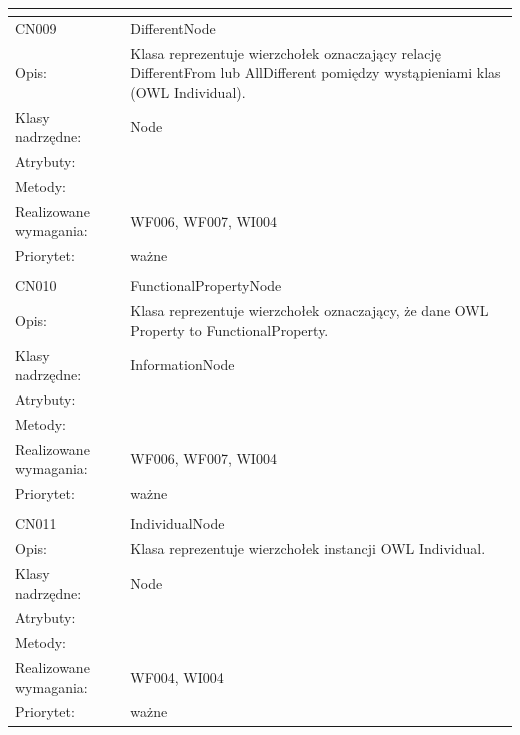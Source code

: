\documentclass[a4paper,10pt]{article}
\begin{document}
\begin{center}
\begin{longtable}{|m{3cm}|m{9cm}|}
\multicolumn{2}{c}{} \\
 \hline

CN009 & DifferentNode \\ \hline
Opis: & Klasa reprezentuje wierzchołek oznaczający relację DifferentFrom lub AllDifferent pomiędzy wystąpieniami klas (OWL Individual).    \\ \hline
Klasy nadrzędne: & Node     \\ \hline
Atrybuty: & %
 \\ \hline
Metody: & %
  \\ \hline
Realizowane wymagania: & WF006, WF007, WI004 \\ \hline
Priorytet: & ważne  \\ \hline

\multicolumn{2}{c}{} \\
 \hline

CN010 & FunctionalPropertyNode \\ \hline
Opis: & Klasa reprezentuje wierzchołek oznaczający, że dane OWL Property to FunctionalProperty.  \\ \hline
Klasy nadrzędne: & InformationNode     \\ \hline
Atrybuty: & %
 \\ \hline
Metody: & %
  \\ \hline
Realizowane wymagania: & WF006, WF007, WI004 \\ \hline
Priorytet: & ważne  \\ \hline

\multicolumn{2}{c}{} \\
 \hline

CN011 & IndividualNode \\ \hline
Opis: & Klasa reprezentuje wierzchołek instancji OWL Individual.  \\ \hline
Klasy nadrzędne: & Node     \\ \hline
Atrybuty: & %
 \\ \hline
Metody: & %
  \\ \hline
Realizowane wymagania: & WF004, WI004 \\ \hline
Priorytet: & ważne  \\ \hline


\end{longtable}
\end{center}
\end{document}
